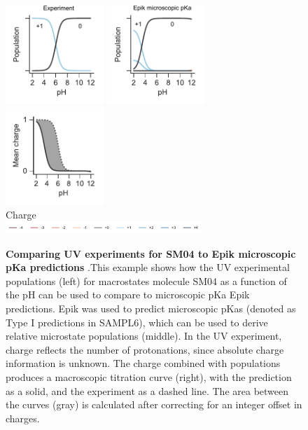\documentclass[9pt,lineno,final]{elife}
\begin{document}
\begin{figure}[H]
	\centering
	\includegraphics[width=0.33\textwidth]{Reports/Experiment-populations-SM04-titled.pdf}
	\includegraphics[width=0.33\textwidth]{Reports/Epik-micropka-populations-SM04-titled.pdf}
	\includegraphics[width=0.33\textwidth]{Reports/Epik-micropka-virtual-titration-SM04.pdf}\\
	Charge \\
	\includegraphics[width=0.66\textwidth, trim={2cm 0 2cm 0},clip]{Reports/overview-charge-legend-SM03.pdf}
		\caption{{\bf Comparing UV experiments for SM04 to Epik microscopic pKa predictions} .This example shows how the UV experimental populations (left) for macrostates molecule SM04 as a function of the pH can be used to compare to microscopic pKa Epik predictions. Epik was used to predict microscopic pKas (denoted as Type I predictions in SAMPL6), which can be used to derive relative microstate populations (middle). In the UV experiment, charge reflects the number of protonations, since absolute charge information is unknown. The charge combined with populations produces a macroscopic titration curve (right), with the prediction as a solid, and the experiment as a dashed line. The area between the curves (gray) is calculated after correcting for an integer offset in charges.  
	\label{fig:epiki-prediction}}
\end{figure}
\end{document}
